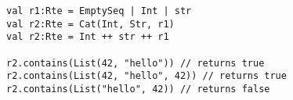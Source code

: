 \begin{lstlisting}[style=scalaioScala]
val r1:Rte = EmptySeq | Int | str
val r2:Rte = Cat(Int, Str, r1)
val r2:Rte = Int ++ str ++ r1

r2.contains(List(42, "hello")) // returns true
r2.contains(List(42, "hello", 42)) // returns true
r2.contains(List("hello", 42)) // returns false
\end{lstlisting}
